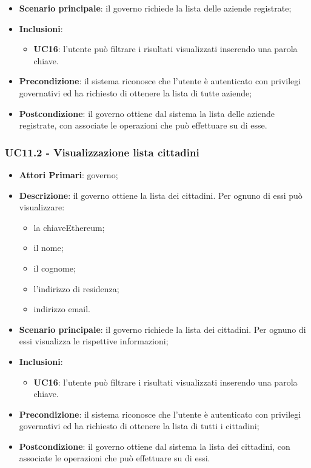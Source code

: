 \begin{itemize}
	\item \textbf{Scenario principale}: il governo richiede la lista delle aziende registrate;
	\item \textbf{Inclusioni}:
	\begin{itemize}
		\item \textbf{UC16}: l'utente può filtrare i risultati visualizzati inserendo una parola chiave.
	\end{itemize}
	\item \textbf{Precondizione}: il sistema riconosce che l'utente è autenticato con privilegi governativi ed ha richiesto di ottenere la lista di tutte aziende;
	\item \textbf{Postcondizione}: il governo ottiene dal sistema la lista delle aziende registrate, con associate le operazioni che può effettuare su di esse.
\end{itemize}

\subsubsection{UC11.2 - Visualizzazione lista cittadini}
\begin{itemize}
	\item \textbf{Attori Primari}: governo;
	\item \textbf{Descrizione}: il governo ottiene la lista dei cittadini. Per ognuno di essi può visualizzare:
	\begin{itemize}
		\item la chiave\glosp Ethereum\glo;
		\item il nome;
		\item il cognome;
		\item l'indirizzo di residenza;
		\item indirizzo email.
	\end{itemize}
	\item \textbf{Scenario principale}: il governo richiede la lista dei cittadini. Per ognuno di essi visualizza le rispettive informazioni;
	\item \textbf{Inclusioni}:
	\begin{itemize}
		\item \textbf{UC16}: l'utente può filtrare i risultati visualizzati inserendo una parola chiave.
	\end{itemize}
	\item \textbf{Precondizione}: il sistema riconosce che l'utente è autenticato con privilegi governativi ed ha richiesto di ottenere la lista di tutti i cittadini;
	\item \textbf{Postcondizione}: il governo ottiene dal sistema la lista dei cittadini, con associate le operazioni che può effettuare su di essi.
\end{itemize}



